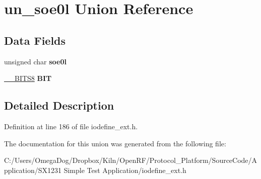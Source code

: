 \hypertarget{unionun__soe0l}{\section{un\-\_\-soe0l Union Reference}
\label{unionun__soe0l}
}
\subsection*{Data Fields}
\begin{DoxyCompactItemize}
\item 
\hypertarget{unionun__soe0l_ae4c3ffb8378fa3c5886a77b5dadd7e50}{unsigned char {\bfseries soe0l}}\label{unionun__soe0l_ae4c3ffb8378fa3c5886a77b5dadd7e50}

\item 
\hypertarget{unionun__soe0l_adc60f5ab45093c4dfec1c4282b60eba3}{\hyperlink{struct_____b_i_t_s8}{\-\_\-\-\_\-\-B\-I\-T\-S8} {\bfseries B\-I\-T}}\label{unionun__soe0l_adc60f5ab45093c4dfec1c4282b60eba3}

\end{DoxyCompactItemize}


\subsection{Detailed Description}


Definition at line 186 of file iodefine\-\_\-ext.\-h.



The documentation for this union was generated from the following file\-:\begin{DoxyCompactItemize}
\item 
C\-:/\-Users/\-Omega\-Dog/\-Dropbox/\-Kiln/\-Open\-R\-F/\-Protocol\-\_\-\-Platform/\-Source\-Code/\-Application/\-S\-X1231 Simple Test Application/iodefine\-\_\-ext.\-h\end{DoxyCompactItemize}
